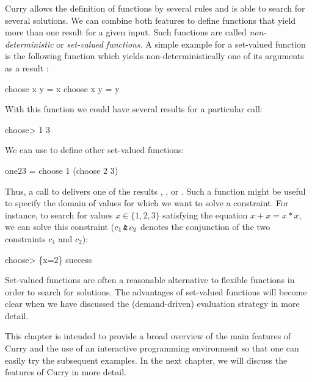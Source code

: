 Curry allows the definition of functions by several rules
and is able to search for several solutions. We can combine
both features to define functions that yield more than one
result for a given input. Such functions are called
\emph{non-deterministic} or \emph{set-valued functions}.%
%
A simple example for a set-valued function
is the following function  which yields
non-deterministically one of its arguments as a result
:
\begin{prog}
choose x y = x
choose x y = y
\end{prog}
With this function we could have several results for a particular call:
\begin{prog}
choose> 
1
3
\end{prog}
We can use  to define other set-valued functions:
\begin{prog}
one23 = choose 1 (choose 2 3)
\end{prog}
Thus, a call to  delivers one of the results ,
, or . Such a function might be useful
to specify the domain of values for which we want to solve a
constraint. For instance, to search for values $x \in \{1,2,3\}$
satisfying the equation $x+x = x*x$, we can solve
this constraint ($c_1\,\code{\&}\,c_2$ denotes the conjunction
of the two constraints $c_1$ and $c_2$):
\begin{prog}
choose> 
\{x=2\} success
\end{prog}
Set-valued functions are often a reasonable alternative
to flexible functions in order to search for solutions.
The advantages of set-valued functions will become clear
when we have discussed the (demand-driven) evaluation strategy
in more detail.

This chapter is intended to provide a broad overview
of the main features of Curry and the use of an interactive
programming environment so that one can easily try the subsequent
examples. In the next chapter, we will discuss the features
of Curry in more detail.



